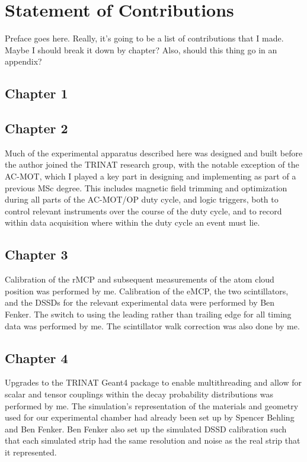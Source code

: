 

\clearpage
\chapter{Statement of Contributions}
\label{ch:contributions}

Preface goes here.  Really, it's going to be a list of contributions that I made.  Maybe I should break it down by chapter?  Also, should this thing go in an appendix?

\section{Chapter 1}
\section{Chapter 2}
Much of the experimental apparatus described here was designed and built before the author joined the TRINAT research group, with the notable exception of the AC-MOT, which I played a key part in designing and implementing as part of a previous MSc degree.  This includes magnetic field trimming and optimization during all parts of the AC-MOT/OP duty cycle, and logic triggers, both to control relevant instruments over the course of the duty cycle, and to record within data acquisition where within the duty cycle an event must lie.  
\section{Chapter 3}
Calibration of the rMCP and subsequent measurements of the atom cloud position was performed by me.  Calibration of the eMCP, the two scintillators, and the DSSDs for the relevant experimental data were performed by Ben Fenker.  The switch to using the leading rather than trailing edge for all timing data was performed by me.  The scintillator walk correction was also done by me.  
\section{Chapter 4}
Upgrades to the TRINAT Geant4 package to enable multithreading and allow for scalar and tensor couplings within the decay probability distributions was performed by me.  The simulation's representation of the materials and geometry used for our experimental chamber had already been set up by Spencer Behling and Ben Fenker.  Ben Fenker also set up the simulated DSSD calibration such that each simulated strip had the same resolution and noise as the real strip that it represented.  

